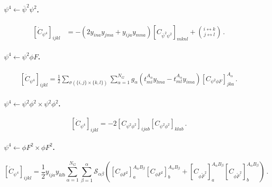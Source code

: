 \paragraph{\texorpdfstring{$\psi^4 \leftarrow \overline \psi^2 \psi^2$}{psi4frompsibar2psi2}.}

\begin{align}
    \left[\dot C_{\psi^4}\right]_{ijkl} &= - (2 y_{ina}y_{jma} + y_{ija}y_{mna}) \left[ C_{\overline \psi^2 \psi^2}\right]_{mknl} 
    + \binom{i \leftrightarrow k}{j \leftrightarrow l}\,.
\end{align}

\paragraph{\texorpdfstring{$\psi^4 \leftarrow \psi^2 \phi F$}{psi4frompsi2phiF}.}

\begin{align}
    \left[\dot C_{\psi^4}\right]_{ijkl} =
    \frac{1}{2}\sum_{\sigma(\{i,j\} \times \{k,l\})}\sum_{\alpha=1}^{N_G} 
    g_\alpha 
    \left(
    t^{A_\alpha}_{mi}y_{lma}-t^{A_\alpha}_{ml}y_{ima}
    \right) \left[C_{\psi^2 \phi F}\right]_{jka}^{A_\alpha}
    \,.
\end{align}

\paragraph{$\psi^4 \leftarrow \psi^2 \phi^2 \times \psi^2 \phi^2$.}

\begin{equation}
    \left[\dot C_{\psi^4}\right]_{ijkl} =
    -2 \left[C_{\psi^2\phi^2}\right]_{ijab} \left[C_{\psi^2\phi^2}\right]_{klab} \,.
\end{equation}

\paragraph{$\psi^4 \leftarrow \phi F^2 \times \phi F^2$.}

\begin{equation}
    \left[\dot C_{\psi^4}\right]_{ijkl} = \frac{1}{2}y_{ija}y_{klb} \sum_{\alpha=1}^{N_G}\sum_{\beta=1}^\alpha \mathcal S_{\alpha \beta} \left(
    \left[C_{\phi F^2}\right]^{A_\alpha B_\beta}_a
    \left[C_{\phi F^2}\right]^{A_\alpha B_\beta}_b
    +
    \left[C_{\phi \widetilde F^2}\right]^{A_\alpha B_\beta}_a
    \left[C_{\phi \widetilde F^2}\right]^{A_\alpha B_\beta}_b
    \right)\,.
\end{equation}


